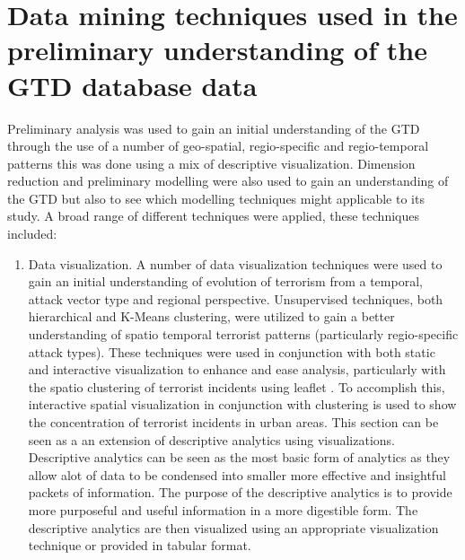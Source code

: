 \section{Data mining techniques used in the preliminary understanding of the GTD database data}
Preliminary analysis was used to gain an initial understanding of the GTD through the use of a number of geo-spatial, regio-specific and regio-temporal patterns this was done using a mix of descriptive visualization. Dimension reduction and preliminary modelling were also used to gain an understanding of the GTD but also to see which modelling techniques might applicable to its study. A broad range of different techniques were applied, these techniques included:
\begin{enumerate}
\item Data visualization. A number of data visualization techniques were used to gain an initial understanding of evolution of terrorism from a temporal, attack vector type and regional perspective. Unsupervised techniques, both hierarchical and K-Means clustering, were utilized to gain a better understanding of spatio temporal terrorist patterns (particularly regio-specific attack types). These techniques were used in conjunction with both static and interactive visualization to enhance and ease analysis, particularly with the spatio clustering of terrorist incidents using leaflet \citep{leaflet2016}. To accomplish this, interactive spatial visualization in conjunction with clustering is used to show the concentration of terrorist incidents in urban areas. 
This section can be seen as a an extension of descriptive analytics using visualizations. Descriptive analytics can be seen as the most basic form of analytics as they allow alot of data to be condensed into smaller more effective and insightful packets of information. The purpose of the descriptive analytics is to provide more purposeful and useful information in a more digestible form. The descriptive analytics are then visualized using an appropriate visualization technique or provided in tabular format. 


\end{enumerate}

